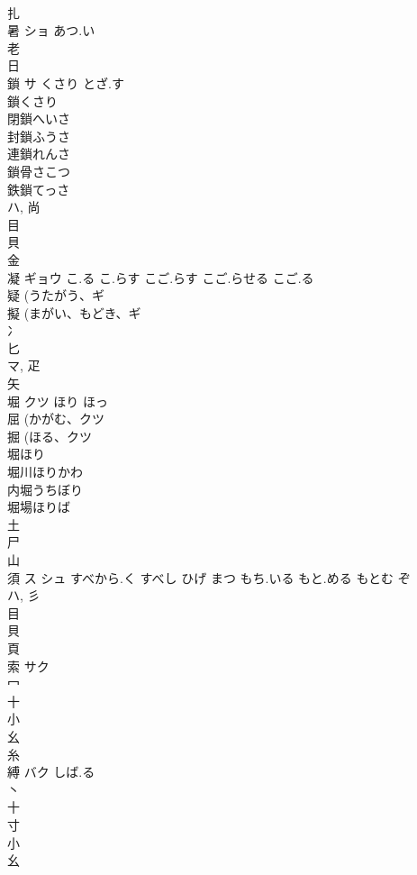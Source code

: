 \documentclass[8pt]{extreport}
\begin{document}
\begin{CJK}{UTF8}{min}
\\	扎	
\\	暑	ショ	あつ.い	
\\	老 
\\	日 
\\	鎖	サ	くさり とざ.す	
\\	鎖くさり
\\	閉鎖へいさ
\\	封鎖ふうさ
\\	連鎖れんさ
\\	鎖骨さこつ
\\	鉄鎖てっさ
\\	ハ, 尚 
\\	目 
\\	貝 
\\	金 
\\	凝	ギョウ	こ.る こ.らす こご.らす こご.らせる こご.る	
\\	疑 (うたがう、ギ 
\\	擬 (まがい、もどき、ギ 
\\	冫 
\\	匕 
\\	マ, 疋 
\\	矢 
\\	堀	クツ	ほり ほっ	
\\	屈 (かがむ、クツ 
\\	掘 (ほる、クツ 
\\	堀ほり 
\\	堀川ほりかわ 
\\	内堀うちぼり 
\\	堀場ほりば 
\\	土 
\\	尸 
\\	山 
\\	須	ス シュ	すべから.く すべし ひげ まつ もち.いる もと.める もとむ ぞ	
\\	ハ, 彡 
\\	目 
\\	貝 
\\	頁 
\\	索	サク		
\\	冖 
\\	十 
\\	小 
\\	幺 
\\	糸 
\\	縛	バク	しば.る	
\\	丶 
\\	十 
\\	寸 
\\	小 
\\	幺 

\end{CJK}
\end{document}
